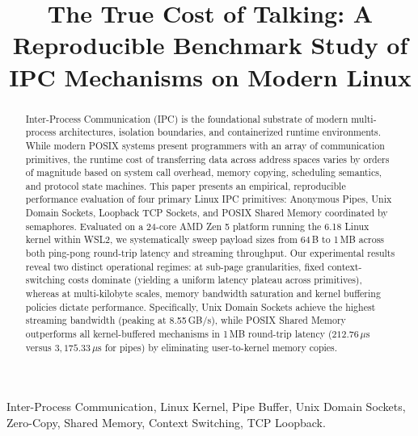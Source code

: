 \documentclass[conference]{IEEEtran}
\begin{document}
\title{The True Cost of Talking: A Reproducible Benchmark Study of IPC Mechanisms on Modern Linux}

\author{
}

\maketitle

\begin{abstract}
Inter-Process Communication (IPC) is the foundational substrate of modern multi-process architectures, isolation boundaries, and containerized runtime environments. While modern POSIX systems present programmers with an array of communication primitives, the runtime cost of transferring data across address spaces varies by orders of magnitude based on system call overhead, memory copying, scheduling semantics, and protocol state machines. This paper presents an empirical, reproducible performance evaluation of four primary Linux IPC primitives: Anonymous Pipes, Unix Domain Sockets, Loopback TCP Sockets, and POSIX Shared Memory coordinated by semaphores. Evaluated on a 24-core AMD Zen 5 platform running the 6.18 Linux kernel within WSL2, we systematically sweep payload sizes from 64\,B to 1\,MB across both ping-pong round-trip latency and streaming throughput. Our experimental results reveal two distinct operational regimes: at sub-page granularities, fixed context-switching costs dominate (yielding a uniform latency plateau across primitives), whereas at multi-kilobyte scales, memory bandwidth saturation and kernel buffering policies dictate performance. Specifically, Unix Domain Sockets achieve the highest streaming bandwidth (peaking at 8.55\,GB/s), while POSIX Shared Memory outperforms all kernel-buffered mechanisms in 1\,MB round-trip latency ($212.76\,\mu\text{s}$ versus $3,175.33\,\mu\text{s}$ for pipes) by eliminating user-to-kernel memory copies.
\end{abstract}

\begin{IEEEkeywords}
Inter-Process Communication, Linux Kernel, Pipe Buffer, Unix Domain Sockets, Zero-Copy, Shared Memory, Context Switching, TCP Loopback.
\end{IEEEkeywords}
\end{document}
